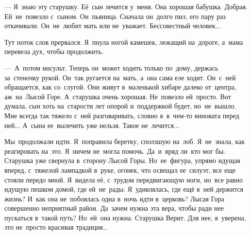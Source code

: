  --- Я~знаю эту старушку.
Её~сын лечится у~меня.
Она хорошая бабушка.
Добрая.
Ей~не~повезло с~сыном.
Он~пьяница.
Сначала он~долго пил, его пару раз откачивали.
Он~не~любит мать или не~уважает.
Бессовестный человек...

Тут поток слов прервался.
Я~пнула ногой камешек, лежащий на~дороге, а~мама перевела дух, чтобы продолжить.


 ---~А~потом инсульт.
Теперь он~может ходить только по~дому, держась за~стеночку рукой.
Он~так ругается на~мать, а~она сама еле ходит.
Он~с~ней обращается, как со~слугой.
Они живут в~маленькой хибаре далеко от~центра, аж~на~Лысой Горе.
А~старушка очень хорошая.
Не~повезло ей~просто.
Вот думала, сын хоть на~старости лет опорой и~поддержкой будет, но~не~вышло.
Мне всегда так тяжело с~ней разговаривать, словно я~в~чем-то виновата перед ней... А~сына ее~вылечить уже нельзя.
Такое не~лечится...
 
Мы~продолжали идти.
Я~поправила беретку, сползшую на~лоб.
Я~не~знала, как реагировать на~это.
Я~ничем не~могла помочь.
Да~и~вряд ли~кто мог бы.
Старушка уже свернула в~сторону Лысой Горы.
Но~ее~фигура, упрямо идущая вперед, с~тяжелой лампадкой в~руке, огонек, что освещал ее~силуэт, все еще стояли передо мной.
Я~видела её, с~трудом передвигающую ноги, но~все равно идущую пешком домой, где ей~не~рады.
Я~удивлялась, где ещё в~ней держится жизнь? И~как она не~побоялась одна в~ночь идти в~церковь? Лысая Гора совершенно неприятный район.
Да~зачем нужна эта вера, чтобы ради нее пускаться в~такой путь? Но~ей~она нужна.
Старушка Верит.
Для нее, я~уверена, это не~просто красивая традиция… 